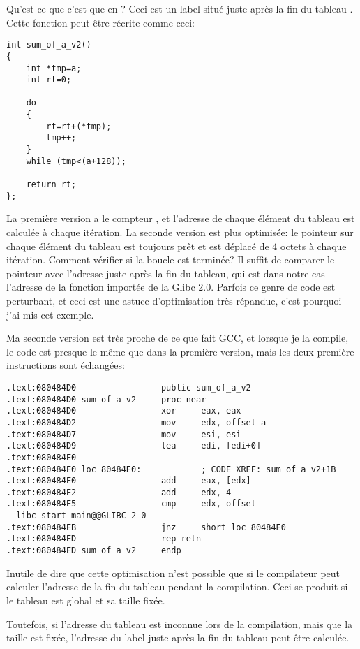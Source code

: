 Qu'est-ce que c'est que  en ?
Ceci est un label situé juste après la fin du tableau .
Cette fonction peut être récrite comme ceci:

\begin{lstlisting}[style=customc]
int sum_of_a_v2()
{
	int *tmp=a;
	int rt=0;
	
	do
	{
		rt=rt+(*tmp);
		tmp++;
	}
	while (tmp<(a+128));

	return rt;
};
\end{lstlisting}

La première version a le compteur , et l'adresse de chaque élément du tableau
est calculée à chaque itération.
La seconde version est plus optimisée: le pointeur sur chaque élément du tableau
est toujours prêt et est déplacé de 4 octets à chaque itération.
Comment vérifier si la boucle est terminée?
Il suffit de comparer le pointeur avec l'adresse juste après la fin du tableau, qui
est dans notre cas l'adresse de la fonction  importée de la Glibc 2.0.
Parfois ce genre de code est perturbant, et ceci est une astuce d'optimisation très
répandue, c'est pourquoi j'ai mis cet exemple.

Ma seconde version est très proche de ce que fait GCC, et lorsque je la compile,
le code est presque le même que dans la première version, mais les deux première
instructions sont échangées:

\begin{lstlisting}[style=customasmx86]
.text:080484D0                 public sum_of_a_v2
.text:080484D0 sum_of_a_v2     proc near
.text:080484D0                 xor     eax, eax
.text:080484D2                 mov     edx, offset a
.text:080484D7                 mov     esi, esi
.text:080484D9                 lea     edi, [edi+0]
.text:080484E0
.text:080484E0 loc_80484E0:            ; CODE XREF: sum_of_a_v2+1B
.text:080484E0                 add     eax, [edx]
.text:080484E2                 add     edx, 4
.text:080484E5                 cmp     edx, offset __libc_start_main@@GLIBC_2_0
.text:080484EB                 jnz     short loc_80484E0
.text:080484ED                 rep retn
.text:080484ED sum_of_a_v2     endp
\end{lstlisting}

Inutile de dire que cette optimisation n'est possible que si le compilateur peut
calculer l'adresse de la fin du tableau pendant la compilation.
Ceci se produit si le tableau est global et sa taille fixée.

Toutefois, si l'adresse du tableau est inconnue lors de la compilation, mais que la
taille est fixée, l'adresse du label juste après la fin du tableau peut être calculée.


